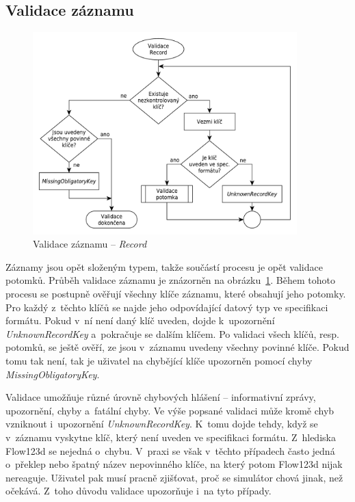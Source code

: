 \documentclass[FM,bw,DP]{tulthesis}
\begin{document}
\clearpage
\subsection{Validace záznamu}

\begin{figure}[h]
	\centering
    \includegraphics[width=0.91\textwidth]{../img/validation_record.pdf}
    \caption{Validace záznamu -- \textit{Record}}
	\label{img:validation_record}
\end{figure}

Záznamy jsou opět složeným typem, takže součástí procesu je opět validace potomků. Průběh validace záznamu je znázorněn na obrázku~\ref{img:validation_record}. Během tohoto procesu se postupně ověřují všechny klíče záznamu, které obsahují jeho potomky. Pro každý z~těchto klíčů se najde jeho odpovídající datový typ ve specifikaci formátu. Pokud v~ní není daný klíč uveden, dojde k~upozornění \textit{UnknownRecordKey} a~pokračuje se dalším klíčem. Po validaci všech klíčů, resp. potomků, se ještě ověří, ze jsou v~záznamu uvedeny všechny povinné klíče. Pokud tomu tak není, tak je uživatel na chybějící klíče upozorněn pomocí chyby \textit{MissingObligatoryKey}.

Validace umožňuje různé úrovně chybových hlášení -- informativní zprávy, upozornění, chyby a~fatální chyby. Ve výše popsané validaci může kromě chyb vzniknout i~upozornění \textit{UnknownRecordKey}. K~tomu dojde tehdy, když se v~záznamu vyskytne klíč, který není uveden ve specifikaci formátu. Z~hlediska Flow123d se nejedná o~chybu. V~praxi se však v~těchto případech často jedná o~překlep nebo špatný název nepovinného klíče, na který potom Flow123d nijak nereaguje. Uživatel pak musí pracně zjišťovat, proč se simulátor chová jinak, než očekává. Z~toho důvodu validace upozorňuje i~na tyto případy.
\end{document}
